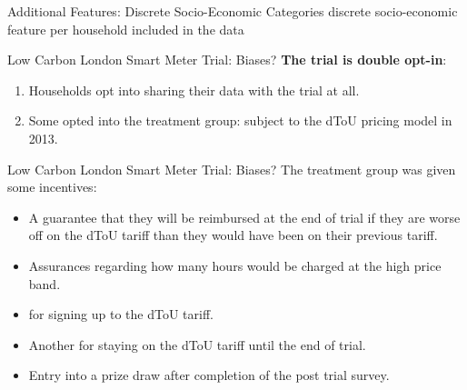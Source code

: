 \documentclass{beamer}
\begin{document}
\begin{frame}{Additional Features: Discrete Socio-Economic Categories}
  discrete socio-economic feature per household included in the data
\end{frame}

\begin{frame}{Low Carbon London Smart Meter Trial: Biases?}
  \textbf{The trial is double opt-in}:
  \begin{enumerate}
    \item<+-> Households opt into sharing their data with the trial at all.
    \item<+-> Some opted into the treatment group: subject to the dToU pricing model in 2013.
  \end{enumerate}
\end{frame}

\begin{frame}{Low Carbon London Smart Meter Trial: Biases?}
  The treatment group was given some incentives: 
  \begin{itemize}
    \item A guarantee that they will be reimbursed at the end of trial if they are worse off on the dToU tariff than they would have been on their previous tariff.
    \item Assurances regarding how many hours would be charged at the high price band.
    \item {} for signing up to the dToU tariff.
    \item Another  for staying on the dToU tariff until the end of trial.
    \item Entry into a prize draw after completion of the post trial survey.
  \end{itemize}
\end{frame}
\end{document}

